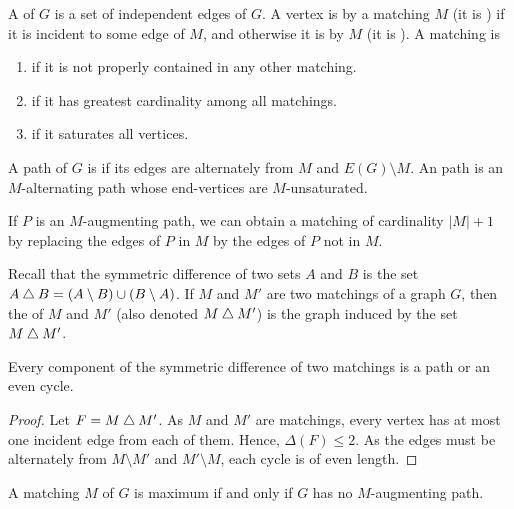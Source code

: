 A  of $G$ is a set of independent edges of $G$. A vertex is  by a matching $M$ (it is ) if it is incident to some edge of $M$, and otherwise it is  by $M$ (it is ). A matching is
\begin{enumerate}[label=(\roman*)]
\item {} if it is not properly contained in any other matching.
\item {} if it has greatest cardinality among all matchings.
\item {} if it saturates all vertices.
\end{enumerate}

A path of $G$ is  if its edges are alternately from $M$ and $E(G) \setminus M$. An  path is an $M$-alternating path whose end-vertices are $M$-unsaturated.

\begin{Note*}
If $P$ is an $M$-augmenting path, we can obtain a matching of cardinality $|M| + 1$ by replacing the edges of $P$ in $M$ by the edges of $P$ not in $M$.
\end{Note*}

Recall that the symmetric difference of two sets $A$ and $B$ is the set $A \mathbin{\triangle} B = (A \setminus B) \cup (B \setminus A)$. If $M$ and $M'$ are two matchings of a graph $G$, then the  of $M$ and $M'$ (also denoted $M \mathbin{\triangle} M'$) is the graph induced by the set $M \mathbin{\triangle} M'$.

\begin{Lemma}\label{lem:SymmDiffMatchings}
Every component of the symmetric difference of two matchings is a path or an even cycle.
\end{Lemma}

\begin{proof}
Let $F = M \mathbin{\triangle} M'$. As $M$ and $M'$ are matchings, every vertex has at most one incident edge from each of them. Hence, $\Delta(F) \le 2$. As the edges must be alternately from $M \setminus M'$ and $M' \setminus M$, each cycle is of even length.
\end{proof}

\begin{Theorem}[Berge]
A matching $M$ of $G$ is maximum if and only if $G$ has no $M$-augmenting path.
\end{Theorem}

